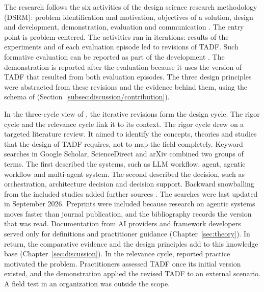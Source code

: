 The research follows the six activities of the design science research methodology (DSRM): problem identification and motivation, objectives of a solution, design and development, demonstration, evaluation and communication \parencite{article}. The entry point is problem-centered. The activities ran in iterations: results of the experiments and of each evaluation episode led to revisions of TADF. Such formative evaluation can be reported as part of the development \parencite{gregorPositioningPresentingDesign2013}. The demonstration is reported after the evaluation because it uses the version of TADF that resulted from both evaluation episodes. The three design principles were abstracted from these revisions and the evidence behind them, using the schema of \textcite{australiannationaluniversityaustraliaResearchPerspectivesAnatomy2020} (Section~\ref{subsec:discussion/contribution}).
 
In the three-cycle view of \textcite{hevnerThreeCycleView2007}, the iterative revisions form the design cycle. The rigor cycle and the relevance cycle link it to its context. The rigor cycle drew on a targeted literature review. It aimed to identify the concepts, theories and studies that the design of TADF requires, not to map the field completely. Keyword searches in Google Scholar, ScienceDirect and arXiv combined two groups of terms. The first described the systems, such as LLM workflow, agent, agentic workflow and multi-agent system. The second described the decision, such as orchestration, architecture decision and decision support. Backward snowballing from the included studies added further sources \parencite{wohlinGuidelinesSnowballingSystematic2014}. The searches were last updated in September 2026. Preprints were included because research on agentic systems moves faster than journal publication, and the bibliography records the version that was read. Documentation from AI providers and framework developers served only for definitions and practitioner guidance (Chapter~\ref{sec:theory}). In return, the comparative evidence and the design principles add to this knowledge base (Chapter~\ref{sec:discussion}). In the relevance cycle, reported practice motivated the problem. Practitioners assessed TADF once its initial version existed, and the demonstration applied the revised TADF to an external scenario. A field test in an organization was outside the scope.
 
